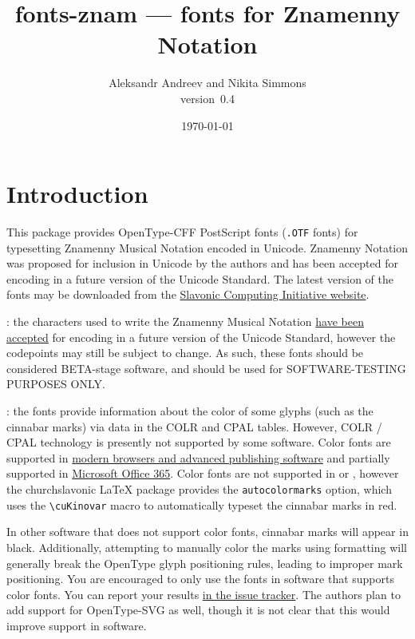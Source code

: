 \documentclass[11pt]{article}
\def\fileversion{0.4}
\def\pkg#1{\textsf{#1}}
\def\cs#1{\texttt{\textbackslash #1}}
\begin{document}
\title{\pkg{fonts-znam} --- fonts for Znamenny Notation}
\author{Aleksandr Andreev and Nikita Simmons\\version~\fileversion}
\date{\today}
\maketitle

\tableofcontents

\section{Introduction}
This package provides OpenType-CFF PostScript fonts (\texttt{.OTF} fonts)
for typesetting Znamenny Musical Notation encoded in Unicode. Znamenny
Notation was proposed for inclusion in Unicode by the authors and has
been accepted for encoding in a future version of the Unicode Standard.
The latest version of the fonts may be downloaded from the
\href{https://sci.ponomar.net/music.html}{Slavonic Computing Initiative website}.

: the characters used to write the Znamenny Musical Notation
\href{http://www.unicode.org/alloc/Pipeline.html}{have been accepted}
for encoding in a future version of the Unicode Standard,
however the codepoints may still be subject to change. As such,
these fonts should be considered BETA-stage software, and should be used
for SOFTWARE-TESTING PURPOSES ONLY.

: the fonts provide information about the color of some
glyphs (such as the cinnabar marks) via data in the COLR and CPAL tables.
However, COLR / CPAL technology is presently not supported by some software.
Color fonts are supported in \href{https://www.colorfonts.wtf/}{modern browsers
and advanced publishing software} and partially supported in
\href{https://office-watch.com/2019/color-font-support-in-microsoft-office-the-story-so-far/}{Microsoft
Office 365}. Color fonts are not supported in \XeTeX{} or \LuaTeX{}, however
the \pkg{churchslavonic} \LaTeX{} package provides the \texttt{autocolormarks} option,
which uses the \cs{cuKinovar} macro to automatically typeset the cinnabar marks in red.

In other software that does not support color fonts, cinnabar marks will appear in black.
Additionally, attempting to manually color the marks using formatting will generally
break the OpenType glyph positioning rules, leading to improper mark positioning.
You are encouraged to only use the fonts in software that supports color fonts. You
can report your results \href{https://github.com/slavonic/fonts-znam/issues/19}{in
the issue tracker}. The authors plan to add support for OpenType-SVG as well, though
it is not clear that this would improve support in software.
\end{document}
